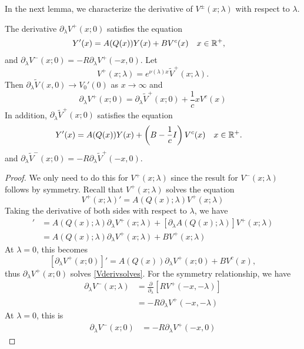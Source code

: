 \documentclass[thesis.tex]{subfiles}
\begin{document}
In the next lemma, we characterize the derivative of $V^\pm(x; \lambda)$ with respect to $\lambda$.

\begin{lemma}\label{lemma:Vpmderiv}
The derivative $\partial_\lambda V^+(x; 0)$ satisfies the equation
\begin{align}\label{Vderivsolves}
Y'(x) &= A(Q(x)) Y(x) + B V^c(x) && x \in \mathbb{R}^+,
\end{align}
and $\partial_\lambda V^-(x; 0) = -R \partial_\lambda V^+(-x, 0)$. Let 
\begin{equation}\label{deftildeV}
V^+(x; \lambda) = e^{\nu(\lambda)x}\tilde{V}^+(x; \lambda).
\end{equation}
Then $\partial_\lambda \tilde{V}(x,0) \rightarrow V_0'(0)$ as $x \rightarrow \infty$ and
\begin{equation}\label{VtildeVderiv}
\partial_\lambda V^+(x; 0)
= \partial_\lambda \tilde{V}^+(x; 0) + \frac{1}{c} x V^c(x) 
\end{equation}
In addition, $\partial_\lambda \tilde{V}^+(x; 0)$ satisfies the equation
\begin{align}\label{tildeVderivsolves}
Y'(x) &= A(Q(x)) Y(x) + \left( B - \frac{1}{c}I \right) V^c(x) && x \in \mathbb{R}^+.
\end{align}
and $\partial_\lambda \tilde{V}^-(x; 0) = -R \partial_\lambda \tilde{V}^+(-x, 0)$.

\begin{proof}
We only need to do this for $V^+(x; \lambda)$ since the result for $V^-(x; \lambda)$ follows by symmetry. Recall that $V^+(x; \lambda)$ solves the equation
\begin{equation}\label{Vplussolves1}
V^+(x; \lambda)' = A(Q(x); \lambda) V^+(x; \lambda)
\end{equation}
Taking the derivative of both sides with respect to $\lambda$, we have
\begin{align*}
[\partial_\lambda V^+(x; \lambda)]' 
&= A(Q(x); \lambda) \partial_\lambda V^+(x; \lambda) + [\partial_\lambda A(Q(x); \lambda)] V^+(x; \lambda) \\
&= A(Q(x); \lambda) \partial_\lambda V^+(x; \lambda) + B V^+(x; \lambda)
\end{align*}
At $\lambda = 0$, this becomes
\[
[\partial_\lambda V^+(x; 0)]' = A(Q(x)) \partial_\lambda V^+(x; 0) + B V^c(x),
\]
thus $\partial_\lambda V^+(x; 0)$ solves \cref{Vderivsolves}. For the symmetry relationship, we have
\begin{align*}
\partial_\lambda V^-(x; \lambda) &= \frac{\partial}{\partial_\lambda}\left[ R V^+(-x, -\lambda)\right] \\
&= -R \partial_\lambda V^+(-x, -\lambda)
\end{align*}
At $\lambda = 0$, this is
\begin{align*}
\partial_\lambda V^-(x; 0) 
&= -R \partial_\lambda V^+(-x, 0)
\end{align*}


\end{proof}
\end{lemma}
\end{document}
